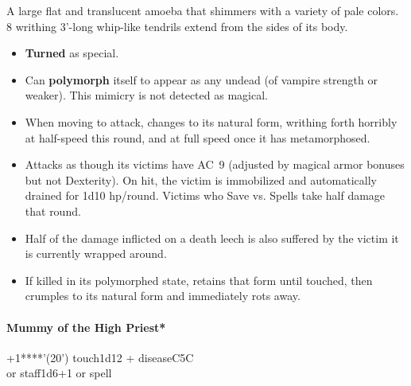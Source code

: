 \documentclass[english,11pt,openany,letterpaper,twocolumn]{book}
\begin{document}
A large flat and translucent amoeba that shimmers with a variety of pale colors. 8 writhing 3'-long whip-like tendrils extend from the sides of its body.
\begin{itemize}[leftmargin=*,label=\itshape\textbullet]
	\item
	\textbf{Turned} as special.
	\item
	Can \textbf{polymorph} itself to appear as any undead (of vampire strength or weaker). This mimicry is not detected as magical.
	\item
	When moving to attack, changes to its natural form, writhing forth horribly at half-speed this round, and at full speed once it has metamorphosed.
	\item
	Attacks as though its victims have AC~9 (adjusted by magical armor bonuses but not Dexterity). On hit, the victim is immobilized and automatically drained for 1d10 hp/round. Victims who Save vs. Spells take half damage that round.
	\item
	Half of the damage inflicted on a death leech is also suffered by the victim it is currently wrapped around.
	\item
	If killed in its polymorphed state, retains that form until touched, then crumples to its natural form and immediately rots away.
\end{itemize}


\skipline
\hypertarget{mummy}{}
\paragraph{Mummy of the High Priest*}

%

+1****'(20') touch\tab 1d12 + disease\tab C5\tab C
\\or staff\tab 1d6+1 or spell
\end{document}
